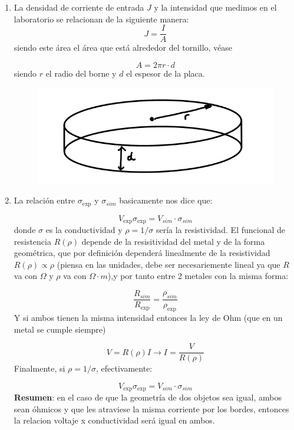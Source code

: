 \begin{enumerate}[label=\alph*)]
	\item La densidad de corriente de entrada $J$ y la intensidad que medimos en el laboratorio se relacionan de la siguiente manera:
	      \begin{equation*}
		      J = \frac{I}{A}
	      \end{equation*}
	      siendo este área el área que está alrededor del tornillo, véase

	      \begin{equation}
		      A = 2 \pi r \cdot d
	      \end{equation}
	      siendo $r$ el radio del borne y $d$ el espesor de la placa.
	      \begin{figure}[H] \centering
		      \includegraphics[width=0.6\linewidth]{Cuerpo/Ch_02/Examen_24_3.png}
	      \end{figure}
	\item La relación entre $\sigma_{\exp}$ y $\sigma_{sim}$ basicamente nos dice que:

	      \begin{equation*}
		      V_{\exp} \sigma_{\exp} = V_{sim} \cdot \sigma_{sim}
	      \end{equation*}
	      donde $\sigma$ es la conductividad y $\rho=1/\sigma$ sería la resistividad. El funcional de resistencia $R(\rho)$ depende de la resisitividad del metal y de la forma geométrica, que por definición dependerá linealmente de la resistividad $R(\rho) \propto \rho$ (piensa en las unidades, debe ser necesariemente lineal ya que $R$ va con $\Omega$ y $\rho$ va con $\Omega \cdot m$),y por tanto entre 2 metales con la misma forma:

	      \begin{equation}
		      \frac{R_{sim}}{R_{\exp}} = \frac{\rho_{sim}}{\rho_{\exp}}
	      \end{equation}
	      Y si ambos tienen la misma intensidad entonces la ley de Ohm (que en un metal se cumple siempre)

	      \begin{equation*}
		      V = R(\rho) I \longrightarrow I = \frac{V}{R(\rho)}
	      \end{equation*}
	      Finalmente, si $\rho = 1/\sigma$, efectivamente:

	      \begin{equation*}
		      V_{\exp} \sigma_{\exp} = V_{sim} \cdot \sigma_{sim}
	      \end{equation*}
	      \textbf{Resumen}: en el caso de que la geometría de dos objetos sea igual, ambos sean óhmicos y que les atraviese la misma corriente por los bordes, entonces la relacion voltaje x conductividad será igual en ambos.
\end{enumerate}

